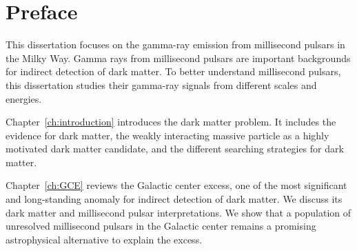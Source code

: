 \documentclass[doublespace,nopageskip]{VTthesis}
\begin{document}



\mainmatter


\chapter*{Preface}

\thispagestyle{plain}

This dissertation focuses on the gamma-ray emission from millisecond pulsars in the Milky Way. Gamma rays from millisecond pulsars are important backgrounds for indirect detection of dark matter. To better understand millisecond pulsars, this dissertation studies their gamma-ray signals from different scales and energies.

Chapter~\ref{ch:introduction} introduces the dark matter problem. It includes the evidence for dark matter, the weakly interacting massive particle as a highly motivated dark matter candidate, and the different searching strategies for dark matter.

Chapter~\ref{ch:GCE} reviews the Galactic center excess, one of the most significant and long-standing anomaly for indirect detection of dark matter. We discuss its dark matter and millisecond pulsar interpretations. We show that a population of unresolved millisecond pulsars in the Galactic center remains a promising astrophysical alternative to explain the excess.
\end{document}
